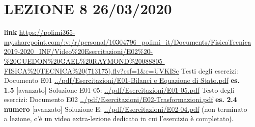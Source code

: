 \section*{LEZIONE 8 26/03/2020}
\textbf{link} \url{https://polimi365-my.sharepoint.com/:v:/r/personal/10304796_polimi_it/Documents/FisicaTecnica2019-2020_INF/Video%20Esercitazioni/E02%20-%20GUEDON%20GAEL%20RAYMOND%20088805-FISICA%20TECNICA%20(713175).flv?csf=1&e=UVKISc}\newline
\newline
Testi degli esercizi:\newline
Documento E01 \url{../pdf/Esercitazioni/E01-Bilanci e Equazione di Stato.pdf}\newline
\textbf{es. 1.5} [avanzato]\newline
Soluzione E01-05: \url{../pdf/Esercitazioni/E01-05.pdf}\newline
\newline
Testo degli esercizi:\newline
Documento E02 \url{../pdf/Esercitazioni/E02-Trasformazioni.pdf}\newline
\textbf{es. 2.4 numero} [avanzato]\newline
Soluzione E: \url{../pdf/Esercitazioni/E02-04.pdf} (non terminato a lezione, c'è un video extra-lezione dedicato in cui l'esercizio è completato).